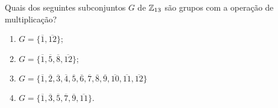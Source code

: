 \documentclass[12pt]{exam}
\begin{document}






\questao{} Quais dos seguintes subconjuntos $G$ de $\mathbb{Z}_{13}$ s{\~a}o grupos
com a opera{\c c}{\~a}o de multiplica{\c c}{\~a}o?
\begin{multicols}{2}
\begin{enumerate}[label=({\alph*})]
\item $G=\{\overline{1},\overline{12}\}$;

\item $G=\{\overline{1},\overline{5},\overline{8},\overline{12}\}$;

\item $G=\{\overline{1},\overline{2},\overline{3},\overline{4}, \overline{5},\overline{6},\overline{7},
 \overline{8},\overline{9},\overline{10},\overline{11},\overline{12}\}$
\item $G=\{\overline{1}, \overline{3},\overline{5},\overline{7},\overline{9},\overline{11}\}$.
\end{enumerate}
\end{multicols}

\vspace{.3cm}
\end{document}
